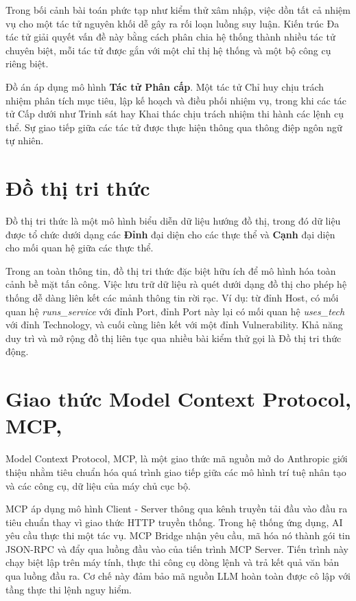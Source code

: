 Trong bối cảnh bài toán phức tạp như kiểm thử xâm nhập, việc dồn tất cả nhiệm vụ cho một tác tử nguyên khối dễ gây ra rối loạn luồng suy luận. Kiến trúc Đa tác tử giải quyết vấn đề này bằng cách phân chia hệ thống thành nhiều tác tử chuyên biệt, mỗi tác tử được gắn với một chỉ thị hệ thống và một bộ công cụ riêng biệt.

Đồ án áp dụng mô hình \textbf{Tác tử Phân cấp}. Một tác tử Chỉ huy chịu trách nhiệm phân tích mục tiêu, lập kế hoạch và điều phối nhiệm vụ, trong khi các tác tử Cấp dưới như Trinh sát hay Khai thác chịu trách nhiệm thi hành các lệnh cụ thể. Sự giao tiếp giữa các tác tử được thực hiện thông qua thông điệp ngôn ngữ tự nhiên. 

\section{Đồ thị tri thức}
Đồ thị tri thức là một mô hình biểu diễn dữ liệu hướng đồ thị, trong đó dữ liệu được tổ chức dưới dạng các \textbf{Đỉnh} đại diện cho các thực thể và \textbf{Cạnh} đại diện cho mối quan hệ giữa các thực thể. 

Trong an toàn thông tin, đồ thị tri thức đặc biệt hữu ích để mô hình hóa toàn cảnh bề mặt tấn công. Việc lưu trữ dữ liệu rà quét dưới dạng đồ thị cho phép hệ thống dễ dàng liên kết các mảnh thông tin rời rạc. Ví dụ: từ đỉnh Host, có mối quan hệ \textit{runs\_service} với đỉnh Port, đỉnh Port này lại có mối quan hệ \textit{uses\_tech} với đỉnh Technology, và cuối cùng liên kết với một đỉnh Vulnerability. Khả năng duy trì và mở rộng đồ thị liên tục qua nhiều bài kiểm thử gọi là Đồ thị tri thức động.

\section{Giao thức Model Context Protocol, MCP,}
Model Context Protocol, MCP, \cite{mcp2024} là một giao thức mã nguồn mở do Anthropic giới thiệu nhằm tiêu chuẩn hóa quá trình giao tiếp giữa các mô hình trí tuệ nhân tạo và các công cụ, dữ liệu của máy chủ cục bộ.

MCP áp dụng mô hình Client - Server thông qua kênh truyền tải đầu vào đầu ra tiêu chuẩn thay vì giao thức HTTP truyền thống. Trong hệ thống ứng dụng, AI yêu cầu thực thi một tác vụ. MCP Bridge nhận yêu cầu, mã hóa nó thành gói tin JSON-RPC và đẩy qua luồng đầu vào của tiến trình MCP Server. Tiến trình này chạy biệt lập trên máy tính, thực thi công cụ dòng lệnh và trả kết quả văn bản qua luồng đầu ra. Cơ chế này đảm bảo mã nguồn LLM hoàn toàn được cô lập với tầng thực thi lệnh nguy hiểm.


